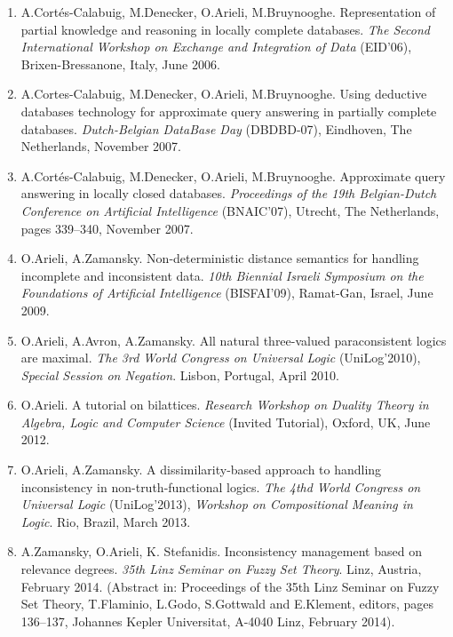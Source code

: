 \documentclass{article}
\begin{document}
\begin{enumerate}
   \item A.Cort\'es-Calabuig, M.Denecker, O.Arieli, M.Bruynooghe.
         Representation of partial knowledge and reasoning in locally complete
         databases. {\em The Second International Workshop on Exchange and
         Integration of Data\/} (EID'06), Brixen-Bressanone, Italy, June 2006.

   \item A.Cortes-Calabuig, M.Denecker, O.Arieli, M.Bruynooghe. Using deductive
         databases technology for approximate query answering in partially
         complete databases. {\em Dutch-Belgian DataBase Day\/} (DBDBD-07),
         Eindhoven, The Netherlands, November 2007.

   \item A.Cort\'es-Calabuig, M.Denecker, O.Arieli, M.Bruynooghe.
         Approximate query answering in locally closed databases.
         {\em Proceedings of the 19th Belgian-Dutch Conference on Artificial Intelligence\/}
         (BNAIC'07), Utrecht, The Netherlands, pages 339--340, November 2007.

   \item O.Arieli, A.Zamansky.
         Non-deterministic distance semantics for handling incomplete and inconsistent data.
         {\em 10th Biennial Israeli Symposium on the Foundations of Artificial
         Intelligence\/} (BISFAI'09), Ramat-Gan, Israel, June 2009.

   \item O.Arieli, A.Avron, A.Zamansky.
         All natural three-valued paraconsistent logics are maximal.
         {\em The 3rd World Congress on Universal Logic\/} (UniLog'2010),
         {\em Special Session on Negation\/}. Lisbon, Portugal, April 2010.

   \item O.Arieli.
         A tutorial on bilattices.
         {\em Research Workshop on Duality Theory in Algebra, Logic and Computer Science\/}
         (Invited Tutorial), Oxford, UK, June 2012.

   \item O.Arieli, A.Zamansky.
         A dissimilarity-based approach to handling inconsistency in non-truth-functional logics.
         {\em The 4thd World Congress on Universal Logic\/} (UniLog'2013),
         {\em Workshop on Compositional Meaning in Logic\/}. Rio, Brazil, March 2013.

   \item A.Zamansky, O.Arieli, K. Stefanidis.
         Inconsistency management based on relevance degrees.
         {\em 35th Linz Seminar on Fuzzy Set Theory\/}. Linz, Austria, February 2014.
         (Abstract in: Proceedings of the 35th Linz Seminar on Fuzzy Set Theory, T.Flaminio, L.Godo, S.Gottwald
         and E.Klement, editors, pages 136--137, Johannes Kepler Universitat, A-4040 Linz, February 2014).


\end{enumerate}
\end{document}
